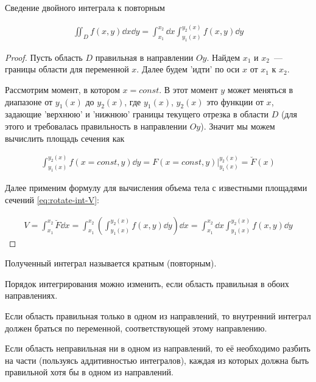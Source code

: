 
\begin{theorem}\label{iint-to-rep}
  Сведение двойного интеграла к повторным

  \begin{align*}
    \iint_{D} f(x, y) \dd x \dd y =
      \int_{x_{1}}^{x_{2}} \dd x \int_{y_{1}(x)}^{y_{2}(x)} f(x, y) \dd y
  \end{align*}
\end{theorem}
\begin{proof}
  Пусть область \(D\) правильная в направлении \(Oy\).
  Найдем \(x_{1}\) и \(x_{2}\)~--- границы области для переменной \(x\).
  Далее будем 'идти' по оси \(x\) от \(x_{1}\) к \(x_{2}\).

  Рассмотрим момент, в котором \(x = const\). В этот момент \(y\) может
  меняться в диапазоне от \(y_{1}(x)\) до \(y_{2}(x)\), где \(y_{1}(x)\),
  \(y_{2}(x)\) это функции от \(x\), задающие 'верхнюю' и 'нижнюю' границы
  текущего отрезка в области \(D\) (для этого и требовалась правильность в
  направлении \(Oy\)). Значит мы можем вычислить площадь сечения как
  
  \begin{align*}
    \int_{y_{1}(x)}^{y_{2}(x)} f(x = const, y) \dd y
    = F(x = const, y) \bigg\vert_{y_{1}(x)}^{y_{2}(x)}
    = \breve{F}(x)
  \end{align*}

  Далее применим формулу для вычисления объема тела с известными площадями
  сечений \eqref{eq:rotate-int-V}:

  \begin{align*}
    V
    = \int_{x_{1}}^{x_{2}} \breve{F} \dd x
    = \int_{x_{1}}^{x_{2}} \left(
      \int_{y_{1}(x)}^{y_{2}(x)} f(x, y) \dd y
    \right) \dd x
    = \int_{x_{1}}^{x_{2}} \dd x \int_{y_{1}(x)}^{y_{2}(x)} f(x, y) \dd y
  \end{align*}
\end{proof}

\begin{remark}
  Полученный интеграл называется кратным (повторным).
\end{remark}

\begin{remark}
  Порядок интегрирования можно изменить, если область правильная в обоих
  направлениях.
  
  Если область правильная только в одном из направлений, то
  внутренний интеграл должен браться по переменной, соответствующей этому
  направлению.

  Если область неправильная ни в одном из направлений, то её необходимо разбить
  на части (пользуясь аддитивностью интегралов), каждая из которых должна быть
  правильной хотя бы в одном из направлений.
\end{remark}